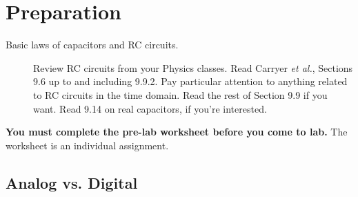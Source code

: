\documentclass[11pt]{article} %
\begin{document}
\section*{Preparation}

\begin{description}
\item [Basic laws of capacitors and RC circuits.] Review RC circuits from your Physics classes. Read Carryer \emph{et al.}, Sections 9.6 up to and including 9.9.2. Pay particular attention to anything related to RC circuits in the time domain. Read the rest of Section 9.9 if you want. Read 9.14 on real capacitors, if you're interested.
\end{description}
{\bf You must complete the pre-lab worksheet before you come to lab.} The worksheet is an individual assignment.

\subsection*{Analog vs. Digital}

%
%
\end{document}
